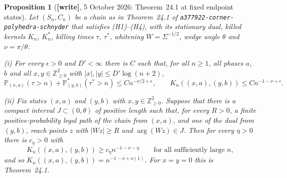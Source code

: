 \documentclass[11pt,letterpaper]{article}
\newtheorem{proposition}[theorem]{Proposition}
\theoremstyle{remark}\newtheorem{remark}[theorem]{Remark}
\newcommand{\ZZ}{\mathbb Z}
\newcommand{\Prob}{\mathbb P}
\newcommand{\1}{\mathbf1}
\newcommand{\wtag}{\textup{\textbf{[write]}}}
\newcommand{\file}[1]{\textup{\nolinkurl{#1}}}
\begin{document}
\begin{proposition}[\wtag, 5 October 2026: Theorem~24.1 at fixed endpoint states]\label{icw:log:prop:endpoints}
Let $(S_n,C_n)$ be a chain as in Theorem~24.1 of \file{a377922-corner-polyhedra-schnyder} that satisfies \textup{(H1)--(H4)}, with its stationary dual, killed kernels $K_n$, $K^*_n$, killing times $\tau$, $\tau^*$, whitening $W=\Sigma^{-1/2}$, wedge angle $\theta$ and $\nu=\pi/\theta$.

\textup{(i)} For every $\epsilon>0$ and $D'<\infty$ there is $C$ such that, for all $n\ge1$, all phases $a$, $b$ and all $x,y\in\ZZ_{\ge0}^2$ with $|x|,|y|\le D'\log(n+2)$,
\begin{equation}\label{icw:log:eq:fixed-upper}
 \Prob_{(x,a)}(\tau>n)+\Prob^*_{(y,b)}(\tau^*>n)\le Cn^{-\nu/2+\epsilon},\qquad
 K_n((x,a),(y,b))\le Cn^{-1-\nu+\epsilon}.
\end{equation}

\textup{(ii)} Fix states $(x,a)$ and $(y,b)$ with $x,y\in\ZZ_{\ge0}^2$. Suppose that there is a compact interval $J\subset(0,\theta)$ of positive length such that, for every $R>0$, a finite positive-probability legal path of the chain from $(x,a)$, and one of the dual from $(y,b)$, reach points $z$ with $|Wz|\ge R$ and $\arg(Wz)\in J$. Then for every $\eta>0$ there is $c_\eta>0$ with
\begin{equation}\label{icw:log:eq:fixed-lower}
 K_n((x,a),(y,b))\ge c_\eta n^{-1-\nu-\eta}\qquad\text{for all sufficiently large }n,
\end{equation}
and so $K_n((x,a),(y,b))=n^{-1-\nu+o(1)}$. For $x=y=0$ this is Theorem~24.1.
\end{proposition}
\end{document}
